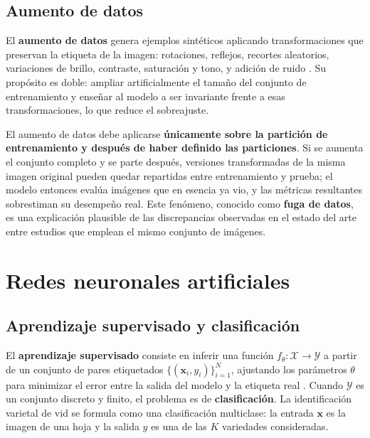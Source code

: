 \subsection{Aumento de datos}
\label{sec:aumento}

El \textbf{aumento de datos} genera ejemplos sintéticos aplicando
transformaciones que preservan la etiqueta de la imagen: rotaciones,
reflejos, recortes aleatorios, variaciones de brillo, contraste, saturación
y tono, y adición de ruido \citep{shorten2019}. Su propósito es doble:
ampliar artificialmente el tamaño del conjunto de entrenamiento y enseñar al
modelo a ser invariante frente a esas transformaciones, lo que reduce el
sobreajuste.

El aumento de datos debe aplicarse \textbf{únicamente sobre la partición de
entrenamiento y después de haber definido las particiones}. Si se aumenta el
conjunto completo y se parte después, versiones transformadas de la misma
imagen original pueden quedar repartidas entre entrenamiento y prueba; el
modelo entonces evalúa imágenes que en esencia ya vio, y las métricas
resultantes sobrestiman su desempeño real. Este fenómeno, conocido como
\textbf{fuga de datos}, es una explicación plausible de las discrepancias
observadas en el estado del arte entre estudios que emplean el mismo
conjunto de imágenes.

\section{Redes neuronales artificiales}

\subsection{Aprendizaje supervisado y clasificación}

El \textbf{aprendizaje supervisado} consiste en inferir una función
$f_{\theta}: \mathcal{X} \rightarrow \mathcal{Y}$ a partir de un conjunto de
pares etiquetados $\{(\mathbf{x}_{i}, y_{i})\}_{i=1}^{N}$, ajustando los
parámetros $\theta$ para minimizar el error entre la salida del modelo y la
etiqueta real \citep{goodfellow2016}. Cuando $\mathcal{Y}$ es un conjunto
discreto y finito, el problema es de \textbf{clasificación}. La
identificación varietal de vid se formula como una clasificación
multiclase: la entrada $\mathbf{x}$ es la imagen de una hoja y la salida
$y$ es una de las $K$ variedades consideradas.

